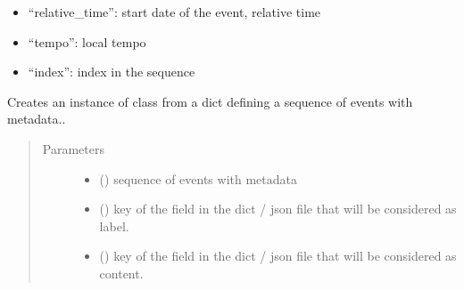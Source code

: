 \documentclass[letterpaper,10pt,english]{sphinxmanual}
\begin{document}
\begin{fulllineitems}
\begin{description}
\begin{itemize}
\item {} 
“relative\_time”: start date of the event, relative time

\item {} 
“tempo”: local tempo

\item {} 
“index”: index in the sequence

\end{itemize}

\end{description}

\end{fulllineitems}


\begin{fulllineitems}
\label{\detokenize{index:GeneratorBuilder.new_generation_handler_from_dict_memory}}
Creates an instance of class {\hyperref[\detokenize{index:Generator.GenerationHandler}]{}} from a dict defining a sequence of events with metadata..
\begin{quote}\begin{description}
\item[{Parameters}] \leavevmode\begin{itemize}
\item {} 
 () \textendash{} sequence of events with metadata

\item {} 
 () \textendash{} key of the field in the dict / json file that will be considered as label.

\item {} 
 () \textendash{} key of the field in the dict / json file that will be considered as content.


\end{itemize}
\end{description}
\end{quote}
\end{fulllineitems}
\end{document}
